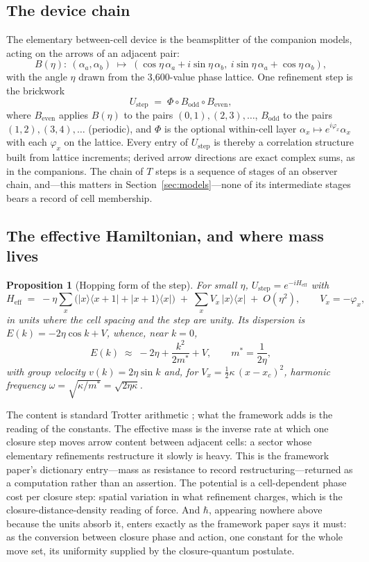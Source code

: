 \documentclass[11pt]{article}
\newtheorem{proposition}{Proposition}
\theoremstyle{definition}
\theoremstyle{remark}
\begin{document}
\subsection{The device chain}
The elementary between-cell device is the beamsplitter of the companion models, acting on the arrows of an adjacent pair:
\[
B(\eta):\ (\alpha_a, \alpha_b) \;\longmapsto\; (\cos\eta\,\alpha_a + i\sin\eta\,\alpha_b,\ i\sin\eta\,\alpha_a + \cos\eta\,\alpha_b),
\]
with the angle $\eta$ drawn from the 3,600-value phase lattice. One refinement step is the brickwork
\[
U_{\mathrm{step}} \;=\; \Phi \circ B_{\mathrm{odd}} \circ B_{\mathrm{even}},
\]
where $B_{\mathrm{even}}$ applies $B(\eta)$ to the pairs $(0,1), (2,3), \dots$, $B_{\mathrm{odd}}$ to the pairs $(1,2), (3,4), \dots$ (periodic), and $\Phi$ is the optional within-cell layer $\alpha_x \mapsto e^{i\varphi_x}\alpha_x$ with each $\varphi_x$ on the lattice. Every entry of $U_{\mathrm{step}}$ is thereby a correlation structure built from lattice increments; derived arrow directions are exact complex sums, as in the companions. The chain of $T$ steps is a sequence of stages of an observer chain, and---this matters in Section~\ref{sec:models}---none of its intermediate stages bears a record of cell membership.

\subsection{The effective Hamiltonian, and where mass lives}
\begin{proposition}[Hopping form of the step]\label{prop:heff}
For small $\eta$, $U_{\mathrm{step}} = e^{-i H_{\mathrm{eff}}}$ with
\[
H_{\mathrm{eff}} \;=\; -\eta \sum_x \big(|x\rangle\langle x{+}1| + |x{+}1\rangle\langle x|\big) \;+\; \sum_x V_x\,|x\rangle\langle x| \;+\; O(\eta^2),
\qquad V_x = -\varphi_x,
\]
in units where the cell spacing and the step are unity. Its dispersion is $E(k) = -2\eta\cos k + V$, whence, near $k = 0$,
\[
E(k) \;\approx\; -2\eta + \frac{k^2}{2m^\ast} + V, \qquad m^\ast = \frac{1}{2\eta},
\]
with group velocity $v(k) = 2\eta \sin k$ and, for $V_x = \tfrac{1}{2}\kappa\,(x - x_c)^2$, harmonic frequency $\omega = \sqrt{\kappa/m^\ast} = \sqrt{2\eta\kappa}$.
\end{proposition}
The content is standard Trotter arithmetic \cite{Trotter1959}; what the framework adds is the reading of the constants. The effective mass is the inverse rate at which one closure step moves arrow content between adjacent cells: a sector whose elementary refinements restructure it slowly is heavy. This is the framework paper's dictionary entry---mass as resistance to record restructuring---returned as a computation rather than an assertion. The potential is a cell-dependent phase cost per closure step: spatial variation in what refinement charges, which is the closure-distance-density reading of force. And $\hbar$, appearing nowhere above because the units absorb it, enters exactly as the framework paper says it must: as the conversion between closure phase and action, one constant for the whole move set, its uniformity supplied by the closure-quantum postulate.
\end{document}
